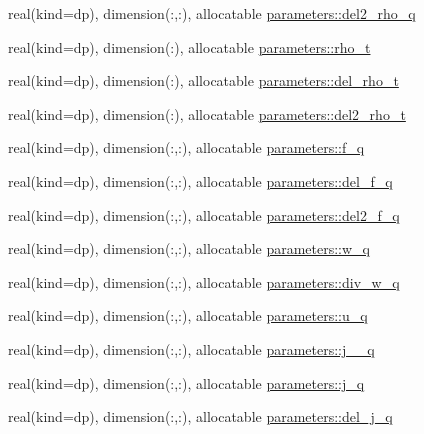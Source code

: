 \begin{DoxyCompactItemize}
\item 
real(kind=dp), dimension(\+:,\+:), allocatable \mbox{\hyperlink{group__DENSITIES_ga9ccabc81160e04e43330cf8f61472f0e}{parameters\+::del2\+\_\+rho\+\_\+q}}
\item 
real(kind=dp), dimension(\+:), allocatable \mbox{\hyperlink{group__DENSITIES_gacd0134e8939522696ec62e629c100fd9}{parameters\+::rho\+\_\+t}}
\item 
real(kind=dp), dimension(\+:), allocatable \mbox{\hyperlink{group__DENSITIES_ga4d25fcfcb307d476b79d22bc2abe545b}{parameters\+::del\+\_\+rho\+\_\+t}}
\item 
real(kind=dp), dimension(\+:), allocatable \mbox{\hyperlink{group__DENSITIES_ga419642d914eb5865bb3537f5a4df7d34}{parameters\+::del2\+\_\+rho\+\_\+t}}
\item 
real(kind=dp), dimension(\+:,\+:), allocatable \mbox{\hyperlink{group__EFF__MASSES_ga5d14e09efe44edd96be9317868828e75}{parameters\+::f\+\_\+q}}
\item 
real(kind=dp), dimension(\+:,\+:), allocatable \mbox{\hyperlink{group__EFF__MASSES_gadd7fc7f6fdfb5f9f6303c42bfb0eb81c}{parameters\+::del\+\_\+f\+\_\+q}}
\item 
real(kind=dp), dimension(\+:,\+:), allocatable \mbox{\hyperlink{group__EFF__MASSES_ga0bdacded69f98c713231b1eeaa1a2d05}{parameters\+::del2\+\_\+f\+\_\+q}}
\item 
real(kind=dp), dimension(\+:,\+:), allocatable \mbox{\hyperlink{group__OTHER__DENSITIES_ga59950b9367b0a0afc462c00ef2eee424}{parameters\+::w\+\_\+q}}
\item 
real(kind=dp), dimension(\+:,\+:), allocatable \mbox{\hyperlink{group__OTHER__DENSITIES_ga20b386857a74ab08ec424aa7d6524f8b}{parameters\+::div\+\_\+w\+\_\+q}}
\item 
real(kind=dp), dimension(\+:,\+:), allocatable \mbox{\hyperlink{group__OTHER__DENSITIES_gae3217b84aeb9cb26575532fa2c7990cf}{parameters\+::u\+\_\+q}}
\item 
real(kind=dp), dimension(\+:,\+:), allocatable \mbox{\hyperlink{group__OTHER__DENSITIES_ga387eae15dcba990096da0b0a974f9858}{parameters\+::j\+\_\+\_\+q}}
\item 
real(kind=dp), dimension(\+:,\+:), allocatable \mbox{\hyperlink{group__OTHER__DENSITIES_gad0e3f674777d52020dcc69ec065a4710}{parameters\+::j\+\_\+q}}
\item 
real(kind=dp), dimension(\+:,\+:), allocatable \mbox{\hyperlink{group__OTHER__DENSITIES_gaa93ef4a0286129df654277cffb40933b}{parameters\+::del\+\_\+j\+\_\+q}}
\item 

\end{DoxyCompactItemize}
